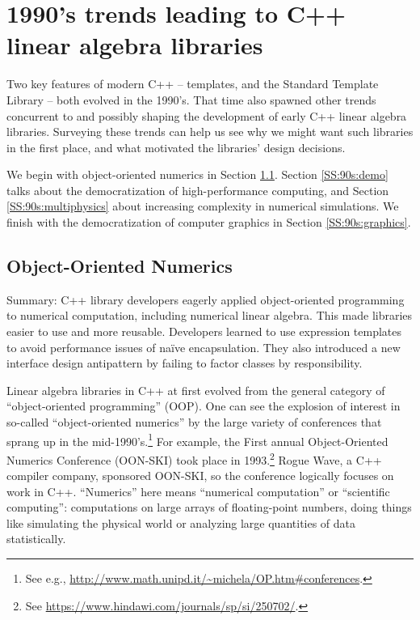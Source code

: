 \section{1990's trends leading to C++ linear algebra libraries}
\label{S:90s}

Two key features of modern C++ -- templates, and the Standard Template
Library -- both evolved in the 1990's.  That time also spawned other
trends concurrent to and possibly shaping the development of early C++
linear algebra libraries.  Surveying these trends can help us see why
we might want such libraries in the first place, and what motivated
the libraries' design decisions.

We begin with object-oriented numerics in Section \ref{SS:90s:OON}.
Section \ref{SS:90s:demo} talks about the democratization of
high-performance computing, and Section \ref{SS:90s:multiphysics}
about increasing complexity in numerical simulations.  We finish with
the democratization of computer graphics in Section
\ref{SS:90s:graphics}.

\subsection{Object-Oriented Numerics}
\label{SS:90s:OON}

Summary: C++ library developers eagerly applied object-oriented
programming to numerical computation, including numerical linear
algebra.  This made libraries easier to use and more reusable.
Developers learned to use expression templates to avoid performance
issues of na\"ive encapsulation.  They also introduced a new interface
design antipattern by failing to factor classes by responsibility.

Linear algebra libraries in C++ at first evolved from the general
category of ``object-oriented programming'' (OOP).  One can see the
explosion of interest in so-called ``object-oriented numerics'' by the
large variety of conferences that sprang up in the
mid-1990's.\footnote{See e.g.,
  \url{http://www.math.unipd.it/~michela/OP.htm\#conferences}.}  For
example, the First annual Object-Oriented Numerics Conference
(OON-SKI) took place in 1993.\footnote{See
  \url{https://www.hindawi.com/journals/sp/si/250702/}.} Rogue Wave, a
C++ compiler company, sponsored OON-SKI, so the conference logically
focuses on work in C++.  ``Numerics'' here means ``numerical
computation'' or ``scientific computing'': computations on large
arrays of floating-point numbers, doing things like simulating the
physical world or analyzing large quantities of data statistically.

